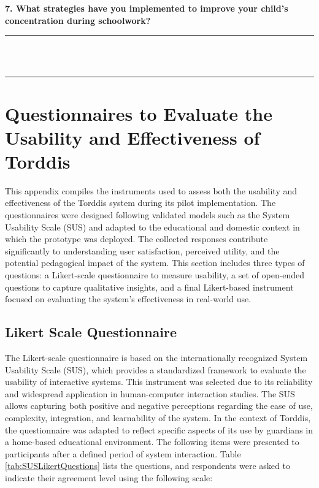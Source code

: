 	\noindent
	\textbf{7. What strategies have you implemented to improve your child’s concentration during schoolwork?}
	
	\vspace{12pt}
	\noindent
	\rule{\textwidth}{0.5pt}	
	\\
	\\
	\noindent
	\rule{\textwidth}{0.5pt}
	
	\clearpage
	
	\section{Questionnaires to Evaluate the Usability and Effectiveness of Torddis} \label{Appendix:Questionnaires}
		This appendix compiles the instruments used to assess both the usability and effectiveness of the Torddis system during its pilot implementation. The questionnaires were designed following validated models such as the System Usability Scale (SUS) and adapted to the educational and domestic context in which the prototype was deployed. The collected responses contribute significantly to understanding user satisfaction, perceived utility, and the potential pedagogical impact of the system. This section includes three types of questions: a Likert-scale questionnaire to measure usability, a set of open-ended questions to capture qualitative insights, and a final Likert-based instrument focused on evaluating the system’s effectiveness in real-world use.
	
		\subsection{Likert Scale Questionnaire} \label{Appendix:SUSLikertQuestionary}
			The Likert-scale questionnaire is based on the internationally recognized System Usability Scale (SUS), which provides a standardized framework to evaluate the usability of interactive systems. This instrument was selected due to its reliability and widespread application in human-computer interaction studies. The SUS allows capturing both positive and negative perceptions regarding the ease of use, complexity, integration, and learnability of the system. In the context of Torddis, the questionnaire was adapted to reflect specific aspects of its use by guardians in a home-based educational environment. The following items were presented to participants after a defined period of system interaction. Table \ref{tab:SUSLikertQuestions} lists the questions, and respondents were asked to indicate their agreement level using the following scale:
			
